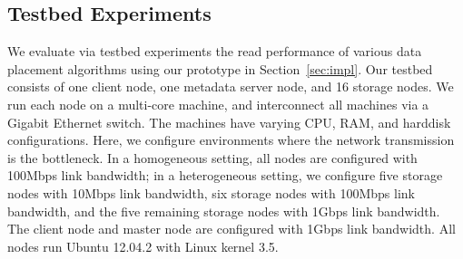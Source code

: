 


\subsection{Testbed Experiments}
\label{subsec:testbed}

We evaluate via testbed experiments the read performance of various data
placement algorithms using our prototype in Section~\ref{sec:impl}.  Our
testbed consists of one client node, one metadata server node, and 16 storage
nodes.  We run each node on a multi-core machine, and interconnect all
machines via a Gigabit Ethernet switch.  The machines have varying CPU,
RAM, and harddisk configurations.  Here, we configure environments where the
network transmission is the bottleneck.   In a homogeneous setting, all nodes
are configured with 100Mbps link bandwidth; in a heterogeneous setting, we
configure five storage nodes with 10Mbps link bandwidth, six storage nodes
with 100Mbps link bandwidth, and the five remaining storage nodes with 1Gbps
link bandwidth.  The client node and master node are configured with 1Gbps
link bandwidth.  All nodes run Ubuntu 12.04.2 with Linux kernel 3.5. 

